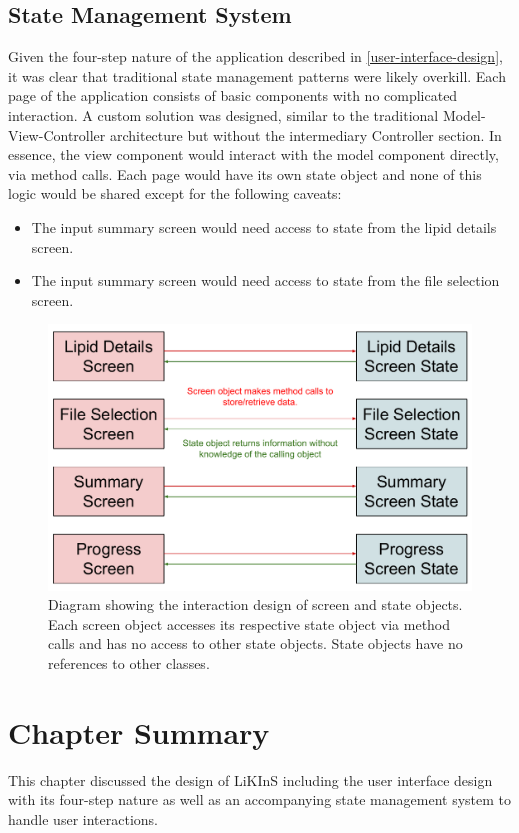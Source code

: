\documentclass{l4proj}
\begin{document}
\subsection{State Management System} \label{state-management-design}
Given the four-step nature of the application described in \ref{user-interface-design}, it was clear that traditional state management patterns were likely overkill. Each page of the application consists of basic components with no complicated interaction. A custom solution was designed, similar to the traditional Model-View-Controller architecture but without the intermediary Controller section. In essence, the view component would interact with the model component directly, via method calls. Each page would have its own state object and none of this logic would be shared except for the following caveats:
\begin{itemize}
    \item The input summary screen would need access to state from the lipid details screen.
    \item The input summary screen would need access to state from the file selection screen.
\end{itemize}

\begin{figure}[htb]
    \centering
    \includegraphics[scale=0.5]{dissertation/images/gui-state-diagram.pdf}
    \caption{Diagram showing the interaction design of screen and state objects. Each screen object accesses its respective state object via method calls and has no access to other state objects. State objects have no references to other classes.}
    \label{fig:gui-state-interaction}
\end{figure}

\section{Chapter Summary}
This chapter discussed the design of LiKInS including the user interface design with its four-step nature as well as an accompanying state management system to handle user interactions.
\end{document}
